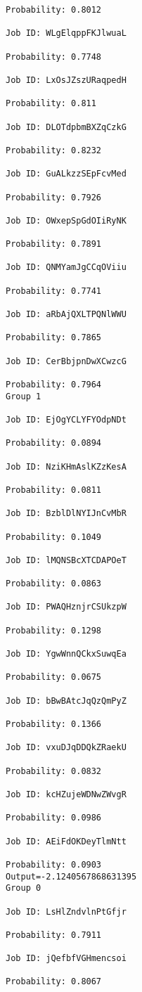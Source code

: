 \documentclass[11pt]{article}
\begin{document}
\begin{Verbatim}[commandchars=\\\{\}]
Probability: 0.8012

Job ID: WLgElqppFKJlwuaL

Probability: 0.7748

Job ID: LxOsJZszURaqpedH

Probability: 0.811

Job ID: DLOTdpbmBXZqCzkG

Probability: 0.8232

Job ID: GuALkzzSEpFcvMed

Probability: 0.7926

Job ID: OWxepSpGdOIiRyNK

Probability: 0.7891

Job ID: QNMYamJgCCqOViiu

Probability: 0.7741

Job ID: aRbAjQXLTPQNlWWU

Probability: 0.7865

Job ID: CerBbjpnDwXCwzcG

Probability: 0.7964
Group 1

Job ID: EjOgYCLYFYOdpNDt

Probability: 0.0894

Job ID: NziKHmAslKZzKesA

Probability: 0.0811

Job ID: BzblDlNYIJnCvMbR

Probability: 0.1049

Job ID: lMQNSBcXTCDAPOeT

Probability: 0.0863

Job ID: PWAQHznjrCSUkzpW

Probability: 0.1298

Job ID: YgwWnnQCkxSuwqEa

Probability: 0.0675

Job ID: bBwBAtcJqQzQmPyZ

Probability: 0.1366

Job ID: vxuDJqDDQkZRaekU

Probability: 0.0832

Job ID: kcHZujeWDNwZWvgR

Probability: 0.0986

Job ID: AEiFdOKDeyTlmNtt

Probability: 0.0903
Output=-2.1240567868631395
Group 0

Job ID: LsHlZndvlnPtGfjr

Probability: 0.7911

Job ID: jQefbfVGHmencsoi

Probability: 0.8067


\end{Verbatim}
\end{document}
